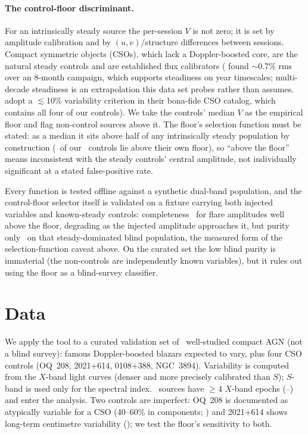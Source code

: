 \documentclass[twocolumn]{aastex631}
\begin{document}
\paragraph{The control-floor discriminant.} For an intrinsically steady source the per-session $V$ is
not zero; it is set by amplitude calibration and by $(u,v)$/structure differences between sessions.
Compact symmetric objects (CSOs), which lack a Doppler-boosted core, are the natural steady controls and
are established flux calibrators (\citealt{fassnachttaylor2001} found $\sim$0.7\% rms over an 8-month
campaign, which supports steadiness on year timescales; multi-decade steadiness is an extrapolation
this data set probes rather than assumes. \citealt{kiehlmann2024} adopt a $\lesssim$10\% variability
criterion in their bona-fide CSO catalog, which contains all four of our controls). We take the
controls' median $V$ as the empirical floor and flag non-control sources above it. The floor's
selection function must be stated: as a median it sits above half of any intrinsically steady
population by construction (\viNctrlAbove\ of our \viNctrl\ controls lie above their own floor), so
``above the floor'' means inconsistent with the steady controls' central amplitude, not individually
significant at a stated false-positive rate.

Every function is tested offline against a synthetic dual-band population, and the control-floor
selector itself is validated on a fixture carrying both injected variables and known-steady controls:
completeness \viSynFloorCompleteness\ for flare amplitudes well above the floor, degrading as the
injected amplitude approaches it, but purity only \viSynFloorPurity\ on that steady-dominated blind population, the measured form of the selection-function caveat above. On the curated set the low
blind purity is immaterial (the non-controls are independently known variables), but it rules out
using the floor as a blind-survey classifier.

\section{Data}
We apply the tool to a curated validation set of \viN\ well-studied compact AGN (not a blind
survey): famous Doppler-boosted blazars expected to vary, plus four CSO controls (OQ~208, 2021+614,
0108+388, NGC~3894). Variability is computed from the $X$-band light curves (denser and more precisely
calibrated than $S$); $S$-band is used only for the spectral index. \viTestable\ sources have $\geq$4
$X$-band epochs (\viEpochYearMin--\viEpochYearMax) and enter the analysis. Two controls are imperfect: OQ~208 is documented as
atypically variable for a CSO (40--60\% in components; \citealt{wu2013}) and 2021+614 shows long-term
centimetre variability (\citealt{taylor2000}); we test the floor's sensitivity to both.
\end{document}
